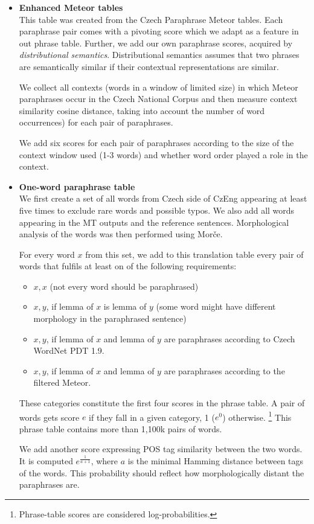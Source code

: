 \documentclass[11pt]{article}
\begin{document}
\begin{itemize}
\item \textbf{Enhanced Meteor tables}\\
This table was created from the Czech Paraphrase Meteor tables. Each paraphrase pair 
comes with a pivoting score which we adapt as a feature in out phrase table.  Further,
we add our own paraphrase scores, acquired by \textit{distributional semantics}. 
Distributional semantics assumes that two phrases are semantically similar if their 
contextual representations are similar. \cite{miller-91}

We collect all contexts (words in a window of limited size) in which Meteor paraphrases 
occur in the Czech National Corpus \cite{SYN2010} and then measure context similarity 
cosine distance, taking into account the number of word occurrences) for each pair of
paraphrases. 

We add six scores for each pair of paraphrases according to the size of the context window 
used (1-3 words) and whether word order played a role in the context. 

\item\textbf{One-word paraphrase table}\\
We first create a set of all words from Czech side of CzEng appearing at least
five times to exclude rare words and possible typos. We also add all words appearing 
in the MT outputs and the reference sentences. Morphological analysis of the words was
then performed using Morče. 

For every word $ x $ from this set, we add to this translation table every pair of 
words that fulfils at least on of the following requirements:

\begin{itemize}
\item $ x,x $ (not every word should be paraphrased)
\item $ x,y $, if lemma of $ x $ is lemma of $ y $ (some word 
might have different morphology in the paraphrased sentence)
\item $ x,y $, if lemma of $ x $ and lemma of $ y $ are paraphrases according 
to Czech WordNet PDT 1.9.
\item $ x,y $, if lemma of $ x $ and lemma of $ y $ are paraphrases according 
to the filtered Meteor.
\end{itemize}

These categories constitute the first four scores in the phrase table. A pair of 
words gets score $ e $ if they fall in a given category, 1 ($e^0$) otherwise.
\footnote{Phrase-table scores are considered log-probabilities.} This phrase table 
contains more than 1,100k pairs of words.

We add another score expressing POS tag similarity between the two words. It is computed 
$ e^{\frac{1}{a+1}}$, where $ a $ is the minimal Hamming distance between tags of the
words. This probability should reflect how morphologically distant the paraphrases are. 
\end{itemize}
\end{document}
